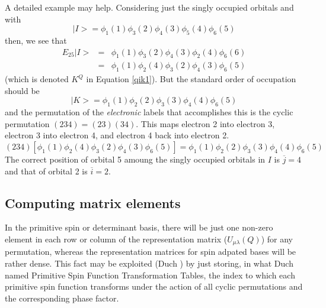 A detailed example may help. Considering just the singly occupied
orbitals and with
\begin{equation}
 |I \! > = \phi_1(1) \phi_3(2) \phi_4(3) \phi_5(4) \phi_6(5)
\end{equation}
then, we see that 
\begin{eqnarray}
  E_{25} |I \! >  & = & \phi_1(1) \phi_3(2) \phi_4(3) \phi_2(4)
\phi_6(6) \\
 & = & \phi_1(1) \phi_2(4) \phi_3(2) \phi_4(3) \phi_6(5) 
\end{eqnarray}
(which is denoted $K^Q$ in Equation \ref{qik1}).  But the standard
order of occupation should be
\begin{equation}
  |K \! >  =  \phi_1(1) \phi_2(2) \phi_3(3) \phi_4(4) \phi_6(5)
\end{equation}
and the permutation of the {\em electronic} labels that accomplishes
this is the cyclic permutation $(2 3 4) = (2 3)(3 4)$.  This maps
electron 2 into electron 3, electron 3 into electron 4, and electron 4
back into electron 2.
\begin{equation}
  (2 3 4) \left[ \phi_1(1) \phi_2(4) \phi_3(2) \phi_4(3) \phi_6(5) 
\right] = \phi_1(1) \phi_2(2) \phi_3(3) \phi_4(4) \phi_6(5)
\end{equation}
The correct position of orbital 5 amoung the singly occupied orbitals
in $I$ is $\overline{j}=4$ and that of orbital 2 is $\overline{i}=2$.

\subsection{Computing matrix elements}

In the primitive spin or determinant basis, there will be just one
non-zero element in each row or column of the representation matrix
($U_{\mu \lambda}(Q)$) for any permutation, whereas the representation
matrices for spin adpated bases will be rather dense.  This fact may
be exploited (Duch \cite{duchspinad}) by just storing, in what Duch
named Primitive Spin Function Transformation Tables, the index to which
each primitive spin function transforms under the action of all cyclic
permutations and the corresponding phase factor.

